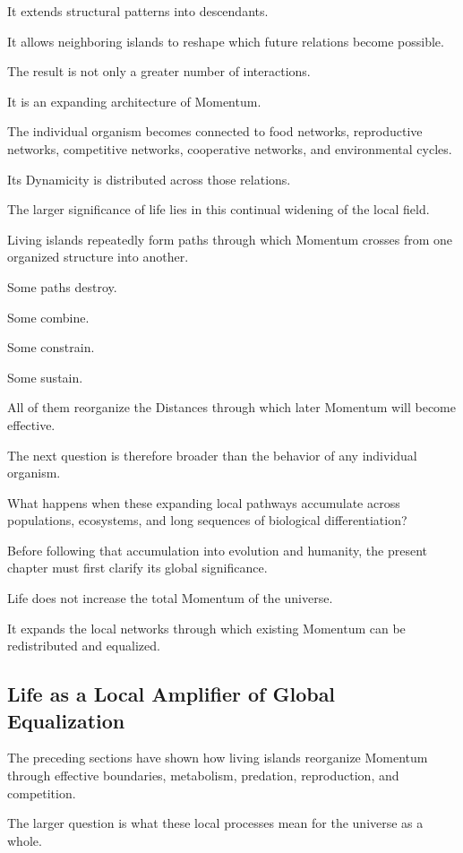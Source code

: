 It extends structural patterns into descendants.

It allows neighboring islands to reshape which future relations become possible.

The result is not only a greater number of interactions.

It is an expanding architecture of Momentum.

The individual organism becomes connected to food networks, reproductive networks, competitive networks, cooperative networks, and environmental cycles.

Its Dynamicity is distributed across those relations.

The larger significance of life lies in this continual widening of the local field.

Living islands repeatedly form paths through which Momentum crosses from one organized structure into another.

Some paths destroy.

Some combine.

Some constrain.

Some sustain.

All of them reorganize the Distances through which later Momentum will become effective.

The next question is therefore broader than the behavior of any individual organism.

What happens when these expanding local pathways accumulate across populations, ecosystems, and long sequences of biological differentiation?

Before following that accumulation into evolution and humanity, the present chapter must first clarify its global significance.

Life does not increase the total Momentum of the universe.

It expands the local networks through which existing Momentum can be redistributed and equalized.

\subsection*{\textbf{Life as a Local Amplifier of Global Equalization}}

The preceding sections have shown how living islands reorganize Momentum through effective boundaries, metabolism, predation, reproduction, and competition.

The larger question is what these local processes mean for the universe as a whole.

